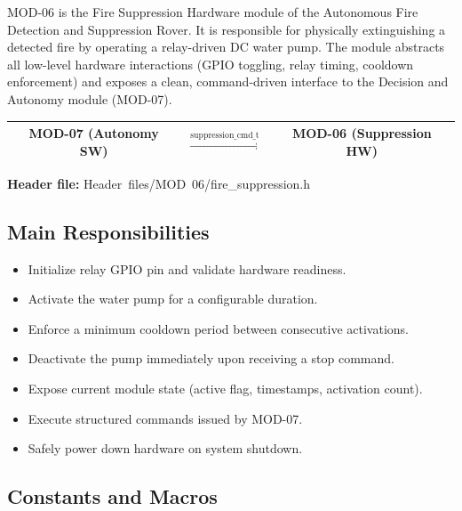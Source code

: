 \documentclass[12pt,a4paper]{article}
\newcommand{\fn}[1]{{\footnotesize\ttfamily #1}}
\begin{document}
MOD-06 is the Fire Suppression Hardware module of the Autonomous Fire Detection
and Suppression Rover. It is responsible for physically extinguishing a detected
fire by operating a relay-driven DC water pump. The module abstracts all low-level
hardware interactions (GPIO toggling, relay timing, cooldown enforcement) and
exposes a clean, command-driven interface to the Decision and Autonomy module
(MOD-07).

\begin{center}
\small
\begin{tabular}{|c|c|c|}
\hline
\textbf{MOD-07 (Autonomy SW)} & $\xrightarrow{\text{suppression\_cmd\_t}}$ & \textbf{MOD-06 (Suppression HW)} \\
\hline
\end{tabular}
\end{center}

\textbf{Header file:} \fn{Header\ files/MOD\ 06/fire\_suppression.h}

\subsection{Main Responsibilities}

\begin{itemize}[leftmargin=1.5em]
  \item Initialize relay GPIO pin and validate hardware readiness.
  \item Activate the water pump for a configurable duration.
  \item Enforce a minimum cooldown period between consecutive activations.
  \item Deactivate the pump immediately upon receiving a stop command.
  \item Expose current module state (active flag, timestamps, activation count).
  \item Execute structured commands issued by MOD-07.
  \item Safely power down hardware on system shutdown.
\end{itemize}

\subsection{Constants and Macros}
\end{document}
